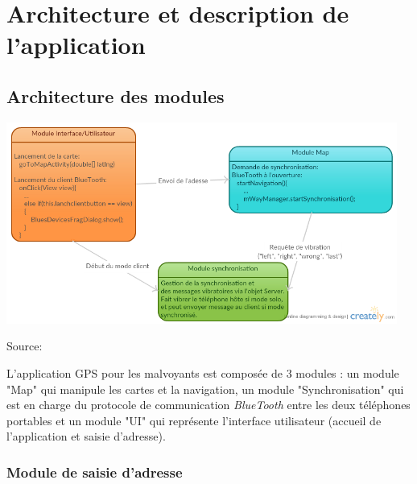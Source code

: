 \chapter{Architecture et description de l'application}

\section{Architecture des modules}
\begin{center}
\includegraphics[height=250px]{Assets/Lien_entre_modules.png}
\begin{flushleft}
\hspace*{15pt}\hbox{\scriptsize Source:} %
\end{flushleft}
\label{LienModule}
\end{center}
L'application GPS pour les malvoyants est composée de 3 modules : un module "Map" qui manipule les cartes et la navigation, un module "Synchronisation" qui est en charge du protocole de communication \textit{BlueTooth} entre les deux téléphones portables et un module "UI" qui représente l'interface utilisateur (accueil de l'application et saisie d'adresse).

\subsection{Module de saisie d'adresse}
\label{subsec:ModuleUI}

